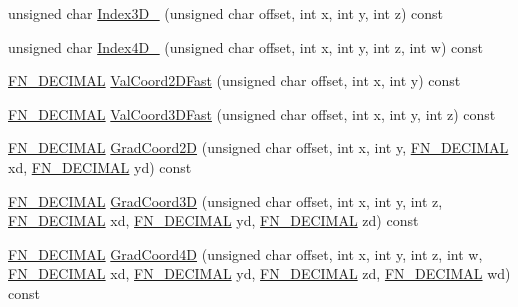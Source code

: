 \begin{DoxyCompactItemize}
\item 
unsigned char \mbox{\hyperlink{class_fast_noise_a1102de0e643266c5ea9b54a5bbca2476}{Index3\+D\+\_}} (unsigned char offset, int x, int y, int z) const
\item 
unsigned char \mbox{\hyperlink{class_fast_noise_a911f18604455d0a36d9203edc0f3387b}{Index4\+D\+\_}} (unsigned char offset, int x, int y, int z, int w) const
\item 
\mbox{\hyperlink{_fast_noise_8h_a75a9ef6d2541c4921815b885bfd449c3}{F\+N\+\_\+\+D\+E\+C\+I\+M\+AL}} \mbox{\hyperlink{class_fast_noise_ace751d0f7929c892937cd97f3e0341a7}{Val\+Coord2\+D\+Fast}} (unsigned char offset, int x, int y) const
\item 
\mbox{\hyperlink{_fast_noise_8h_a75a9ef6d2541c4921815b885bfd449c3}{F\+N\+\_\+\+D\+E\+C\+I\+M\+AL}} \mbox{\hyperlink{class_fast_noise_a8711ebad77216b74f5d248deb024de2f}{Val\+Coord3\+D\+Fast}} (unsigned char offset, int x, int y, int z) const
\item 
\mbox{\hyperlink{_fast_noise_8h_a75a9ef6d2541c4921815b885bfd449c3}{F\+N\+\_\+\+D\+E\+C\+I\+M\+AL}} \mbox{\hyperlink{class_fast_noise_ad264b1bd7c819f7d5d9b5d5695a140a8}{Grad\+Coord2D}} (unsigned char offset, int x, int y, \mbox{\hyperlink{_fast_noise_8h_a75a9ef6d2541c4921815b885bfd449c3}{F\+N\+\_\+\+D\+E\+C\+I\+M\+AL}} xd, \mbox{\hyperlink{_fast_noise_8h_a75a9ef6d2541c4921815b885bfd449c3}{F\+N\+\_\+\+D\+E\+C\+I\+M\+AL}} yd) const
\item 
\mbox{\hyperlink{_fast_noise_8h_a75a9ef6d2541c4921815b885bfd449c3}{F\+N\+\_\+\+D\+E\+C\+I\+M\+AL}} \mbox{\hyperlink{class_fast_noise_a96bc7b4cc9a84cec68c16bf6dfce4f53}{Grad\+Coord3D}} (unsigned char offset, int x, int y, int z, \mbox{\hyperlink{_fast_noise_8h_a75a9ef6d2541c4921815b885bfd449c3}{F\+N\+\_\+\+D\+E\+C\+I\+M\+AL}} xd, \mbox{\hyperlink{_fast_noise_8h_a75a9ef6d2541c4921815b885bfd449c3}{F\+N\+\_\+\+D\+E\+C\+I\+M\+AL}} yd, \mbox{\hyperlink{_fast_noise_8h_a75a9ef6d2541c4921815b885bfd449c3}{F\+N\+\_\+\+D\+E\+C\+I\+M\+AL}} zd) const
\item 
\mbox{\hyperlink{_fast_noise_8h_a75a9ef6d2541c4921815b885bfd449c3}{F\+N\+\_\+\+D\+E\+C\+I\+M\+AL}} \mbox{\hyperlink{class_fast_noise_a96464d203e3868b31bcd9248f32ae259}{Grad\+Coord4D}} (unsigned char offset, int x, int y, int z, int w, \mbox{\hyperlink{_fast_noise_8h_a75a9ef6d2541c4921815b885bfd449c3}{F\+N\+\_\+\+D\+E\+C\+I\+M\+AL}} xd, \mbox{\hyperlink{_fast_noise_8h_a75a9ef6d2541c4921815b885bfd449c3}{F\+N\+\_\+\+D\+E\+C\+I\+M\+AL}} yd, \mbox{\hyperlink{_fast_noise_8h_a75a9ef6d2541c4921815b885bfd449c3}{F\+N\+\_\+\+D\+E\+C\+I\+M\+AL}} zd, \mbox{\hyperlink{_fast_noise_8h_a75a9ef6d2541c4921815b885bfd449c3}{F\+N\+\_\+\+D\+E\+C\+I\+M\+AL}} wd) const
\end{DoxyCompactItemize}

